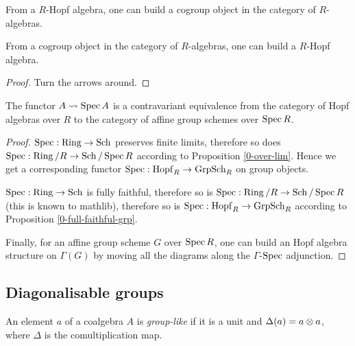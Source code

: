 \begin{proposition}
  \label{0-hopf-cogrp-alg}
  \uses{}

  From a $R$-Hopf algebra, one can build a cogroup object in the category of $R$-algebras.

  From a cogroup object in the category of $R$-algebras, one can build a $R$-Hopf algebra.
\end{proposition}
\begin{proof}
  \uses{}

  Turn the arrows around.
\end{proof}


\begin{theorem}
  \label{0-hopf-equiv-aff-grp-sch}
  \uses{}
  \leanok

  The functor $A\rightsquigarrow \operatorname{Spec} A$ is a contravariant equivalence from the category of Hopf algebras over $R$ to the category of affine group schemes over $\operatorname{Spec} R$.
\end{theorem}
\begin{proof}

  $\operatorname{Spec} : \operatorname{Ring} \to \operatorname{Sch}$ preserves finite limits, therefore so does $\operatorname{Spec} : \operatorname{Ring} / R \to \operatorname{Sch} / \operatorname{Spec} R$ according to Proposition \ref{0-over-lim}. Hence we get a corresponding functor $\operatorname{Spec} : \operatorname{Hopf}_R \to \operatorname{GrpSch}_R$ on group objects.

  $\operatorname{Spec} : \operatorname{Ring} \to \operatorname{Sch}$ is fully faithful, therefore so is $\operatorname{Spec} : \operatorname{Ring} / R \to \operatorname{Sch} / \operatorname{Spec} R$ (this is known to mathlib), therefore so is $\operatorname{Spec} : \operatorname{Hopf}_R \to \operatorname{GrpSch}_R$ according to Proposition \ref{0-full-faithful-grp}.

  Finally, for an affine group scheme $G$ over $\operatorname{Spec} R$, one can build an Hopf algebra structure on $\Gamma(G)$ by moving all the diagrams along the $\Gamma$-$\operatorname{Spec}$ adjunction.
\end{proof}


\subsection{Diagonalisable groups}


\begin{definition}
  \label{0-grp-like}
  \uses{}
  \leanok

  An element $a$ of a coalgebra $A$ is \emph{group-like} if it is a unit and $\Delta(a) = a \otimes a$, where $\Delta$ is the comultiplication map.
\end{definition}


